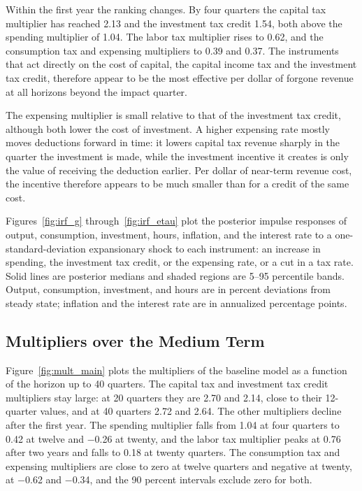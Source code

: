 \documentclass[article,11pt,letterpaper,fleqn]{article}
\theoremstyle{definition}
\numberwithin{equation}{section}
\begin{document}
Within the first year the ranking changes. By four quarters the capital tax multiplier has reached 2.13 and the investment tax credit 1.54, both above the spending multiplier of 1.04. The labor tax multiplier rises to 0.62, and the consumption tax and expensing multipliers to 0.39 and 0.37. The instruments that act directly on the cost of capital, the capital income tax and the investment tax credit, therefore appear to be the most effective per dollar of forgone revenue at all horizons beyond the impact quarter.

The expensing multiplier is small relative to that of the investment tax credit, although both lower the cost of investment. A higher expensing rate mostly moves deductions forward in time: it lowers capital tax revenue sharply in the quarter the investment is made, while the investment incentive it creates is only the value of receiving the deduction earlier. Per dollar of near-term revenue cost, the incentive therefore appears to be much smaller than for a credit of the same cost.

Figures~\ref{fig:irf_g} through~\ref{fig:irf_etau} plot the posterior impulse responses of output, consumption, investment, hours, inflation, and the interest rate to a one-standard-deviation expansionary shock to each instrument: an increase in spending, the investment tax credit, or the expensing rate, or a cut in a tax rate. Solid lines are posterior medians and shaded regions are 5--95 percentile bands. Output, consumption, investment, and hours are in percent deviations from steady state; inflation and the interest rate are in annualized percentage points.

\subsection{Multipliers over the Medium Term}

Figure~\ref{fig:mult_main} plots the multipliers of the baseline model as a function of the horizon up to 40 quarters. The capital tax and investment tax credit multipliers stay large: at 20 quarters they are 2.70 and 2.14, close to their 12-quarter values, and at 40 quarters 2.72 and 2.64. The other multipliers decline after the first year. The spending multiplier falls from 1.04 at four quarters to 0.42 at twelve and $-$0.26 at twenty, and the labor tax multiplier peaks at 0.76 after two years and falls to 0.18 at twenty quarters. The consumption tax and expensing multipliers are close to zero at twelve quarters and negative at twenty, at $-$0.62 and $-$0.34, and the 90 percent intervals exclude zero for both.
\end{document}
